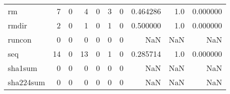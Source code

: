 \begin{tabular}{lrrrrrrrrr}
rm        &                                                  7 &                                                  0 &                                                  4 &                                                  0 &                                                  3 &                                                  0 &                                           0.464286 &                                    1.0 &                             0.000000 \\
rmdir     &                                                  2 &                                                  0 &                                                  1 &                                                  0 &                                                  1 &                                                  0 &                                           0.500000 &                                    1.0 &                             0.000000 \\
runcon    &                                                  0 &                                                  0 &                                                  0 &                                                  0 &                                                  0 &                                                  0 &                                                NaN &                                    NaN &                                  NaN \\
seq       &                                                 14 &                                                  0 &                                                 13 &                                                  0 &                                                  1 &                                                  0 &                                           0.285714 &                                    1.0 &                             0.000000 \\
sha1sum   &                                                  0 &                                                  0 &                                                  0 &                                                  0 &                                                  0 &                                                  0 &                                                NaN &                                    NaN &                                  NaN \\
sha224sum &                                                  0 &                                                  0 &                                                  0 &                                                  0 &                                                  0 &                                                  0 &                                                NaN &                                    NaN &                                  NaN \\

\end{tabular}
